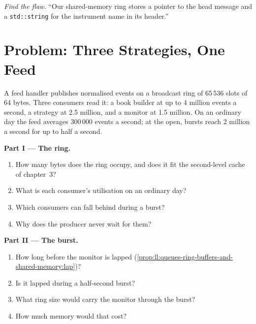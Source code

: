 \begin{exercise}[$\star\star\star$]\label{exo:ll:queues-ring-buffers-and-shared-memory:8}
\emph{Find the flaw.} ``Our shared-memory ring stores a pointer to the head message and a \texttt{std::string} for the instrument
name in its header.''
\end{exercise}

\section{Problem: Three Strategies, One Feed}

\begin{problem}\label{pb:ll:queues-ring-buffers-and-shared-memory:1}
A feed handler publishes normalised events on a broadcast ring of 65\,536 slots of 64 bytes. Three consumers read it: a book
builder at up to 4 million events a second, a strategy at 2.5 million, and a monitor at 1.5 million. On an ordinary day the feed
averages 300\,000 events a second; at the open, bursts reach 2 million a second for up to half a second.

\medskip\noindent\textbf{Part I --- The ring.}
\begin{enumerate}
\item How many bytes does the ring occupy, and does it fit the second-level cache of chapter~3?
\item What is each consumer's utilisation on an ordinary day?
\item Which consumers can fall behind during a burst?
\item Why does the producer never wait for them?
\end{enumerate}

\medskip\noindent\textbf{Part II --- The burst.}
\begin{enumerate}[resume]
\item How long before the monitor is lapped (\cref{prop:ll:queues-ring-buffers-and-shared-memory:lap})?
\item Is it lapped during a half-second burst?
\item What ring size would carry the monitor through the burst?
\item How much memory would that cost?
\end{enumerate}


\end{problem}
